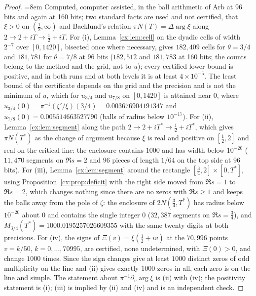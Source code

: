 \begin{proof}
{\emergencystretch=8em Computed, computer assisted, in the ball arithmetic of Arb at 96 bits and again at 160 bits; two standard facts are used and not certified, that $\xi>0$ on $(\tfrac12,\infty)$ and Backlund's relation $\pi N(T)=\Delta\arg\xi$ along $2\to2+iT\to\tfrac12+iT$. For (i), Lemma~\ref{cx:lem:cell} on the dyadic cells of width $2^{-7}$ over $[0,1420]$, bisected once where necessary, gives $182{,}409$ cells for $\theta=3/4$ and $181{,}781$ for $\theta=7/8$ at 96 bits ($182{,}512$ and $181{,}783$ at 160 bits; the counts belong to the method and the grid, not to $u$); every certified lower bound is positive, and in both runs and at both levels it is at least $4\times10^{-5}$. The least bound of the certificate depends on the grid and the precision and is not the minimum of $u$, which for $u_{3/4}$ and $u_{7/8}$ on $[0,1420]$ is attained near $0$, where $u_{3/4}(0)=\pi^{-1}(\xi'/\xi)(3/4)=0.003676904191347$ and $u_{7/8}(0)=0.005514663527790$ (balls of radius below $10^{-17}$). For (ii), Lemma~\ref{cx:lem:segment} along the path $2\to2+iT^*\to\tfrac12+iT^*$, which gives $\pi N(T^*)$ as the change of argument because $\xi$ is real and positive on $[\tfrac12,2]$ and real on the critical line: the enclosure contains $1000$ and has width below $10^{-20}$ ($11{,}470$ segments on $\Re s=2$ and $96$ pieces of length $1/64$ on the top side at 96 bits). For (iii), Lemma~\ref{cx:lem:segment} around the rectangle $[\tfrac34,2]\times[0,T^*]$, using Proposition~\ref{cx:prop:deficit} with the right side moved from $\Re s=1$ to $\Re s=2$, which changes nothing since there are no zeros with $\Re s\ge1$ and keeps the balls away from the pole of $\zeta$: the enclosure of $2N(\tfrac34,T^*)$ has radius below $10^{-20}$ about $0$ and contains the single integer $0$ ($32{,}387$ segments on $\Re s=\tfrac34$), and $M_{3/4}(T^*)=1000.0195257026609355$ with the same twenty digits at both precisions. For (iv), the signs of $\Xi(v)=\xi(\tfrac12+iv)$ at the $70{,}996$ points $v=k/50$, $k=0,\dots,70995$, are certified, none undetermined, with $\Xi(0)>0$, and change $1000$ times. Since the sign changes give at least $1000$ distinct zeros of odd multiplicity on the line and (ii) gives exactly $1000$ zeros in all, each zero is on the line and simple. The statement about $\pi^{-1}\partial_v\arg\xi$ is (ii) with (iv); the positivity statement is (i); (iii) is implied by (ii) and (iv) and is an independent check.\par}
\end{proof}

